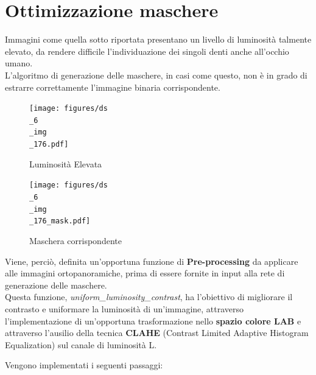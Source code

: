 \documentclass[12pt,a4paper,openright,twoside]{book}
\begin{document}
\section{Ottimizzazione maschere}
Immagini come quella sotto riportata presentano un livello di luminosità talmente elevato, da rendere difficile l'individuazione dei singoli denti anche all'occhio umano. \\
L'algoritmo di generazione delle maschere, in casi come questo, non è in grado di estrarre correttamente l'immagine binaria corrispondente.
\begin{figure}[H]
	\centering
	\texttt{[image: figures/ds\\\_6\\\_img\\\_176.pdf]}
    	\caption{Luminosità Elevata}
	\label{fig:luminosità}
\end{figure}
\begin{figure}[H]
	\centering
	\texttt{[image: figures/ds\\\_6\\\_img\\\_176\_mask.pdf]}
    	\caption{Maschera corrispondente}
	\label{fig:maskLuminosa}
\end{figure}
Viene, perciò, definita un'opportuna funzione di \textbf{Pre-processing} da applicare alle immagini ortopanoramiche, prima di essere fornite in input alla rete di generazione delle maschere.\\
Questa funzione, {\itshape uniform\_luminosity\_contrast}, ha l'obiettivo di migliorare il contrasto e uniformare la luminosità di un'immagine, attraverso l'implementazione di un'opportuna trasformazione nello \textbf{spazio colore LAB} e attraverso l'ausilio della tecnica \textbf{CLAHE} (Contrast Limited Adaptive Histogram Equalization) sul canale di luminosità L.
\begin{figure}[H]
    \centering
    
\end{figure}
Vengono implementati i seguenti passaggi:
\end{document}
